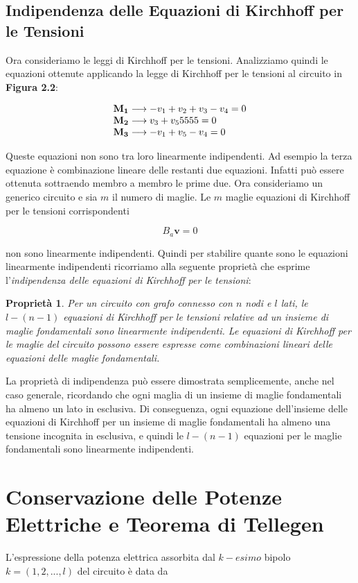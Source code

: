 \documentclass[a4paper]{report}
\newtheorem{prop}{Propriet\`a}
\begin{document}
\subsection{Indipendenza delle Equazioni di Kirchhoff per le Tensioni}

Ora consideriamo le leggi di Kirchhoff per le tensioni. Analizziamo
quindi le equazioni ottenute applicando la legge di Kirchhoff per le
tensioni al circuito in {\bf Figura 2.2}:

\[
\begin{array}{l l l}
  \mathbf{M_1}\longrightarrow -v_1+v_2+v_3-v_4=0\\
  \mathbf{M_2}\longrightarrow v_3+v_55555=0\\
  \mathbf{M_3}\longrightarrow -v_1+v_5-v_4=0  
\end{array}  
\]

Queste equazioni non sono tra loro linearmente indipendenti. Ad
esempio la terza equazione \`e combinazione lineare delle restanti due
equazioni. Infatti pu\`o essere ottenuta sottraendo membro a membro
le prime due.
Ora consideriamo un generico circuito e sia $m$ il numero di
maglie. Le $m$ maglie equazioni di Kirchhoff per le tensioni
corrispondenti

\[
B_a\mathbf{v}=0
\]

non sono linearmente indipendenti. Quindi per stabilire quante sono le
equazioni linearmente indipendenti ricorriamo alla seguente
propriet\`a che esprime l'\emph{indipendenza delle equazioni di
  Kirchhoff per le tensioni}:

\begin{prop}
  Per un circuito con grafo connesso con $n$ nodi e $l$ lati, le
  $l-(n-1)$ equazioni di Kirchhoff per le tensioni relative ad un
  insieme di maglie fondamentali sono linearmente indipendenti. Le
  equazioni di Kirchhoff per le maglie del circuito possono essere
  espresse come combinazioni lineari delle equazioni delle maglie fondamentali.
\end{prop}

La propriet\`a di indipendenza pu\`o essere dimostrata semplicemente,
anche nel caso generale, ricordando che ogni maglia di un insieme di
maglie fondamentali ha almeno un lato in esclusiva. Di conseguenza,
ogni equazione dell'insieme delle equazioni di Kirchhoff per un
insieme di maglie fondamentali ha almeno una tensione incognita in
esclusiva, e quindi le $l-(n-1)$ equazioni per le maglie fondamentali
sono linearmente indipendenti.

\section{Conservazione delle Potenze Elettriche e Teorema di Tellegen}
L'espressione della potenza elettrica assorbita dal $k-esimo$ bipolo
$k=(1, 2,..., l)$ del circuito \`e data da
\end{document}
